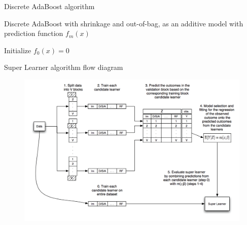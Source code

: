 
\begin{frame}[fragile]{Discrete AdaBoost algorithm}

Discrete AdaBoost with shrinkage and out-of-bag, as an additive model with prediction function $f_m(x)$

{%
\setlength{\interspacetitleruled}{0pt}%
\setlength{\algotitleheightrule}{0pt}%
\begin{algorithm}[H]
Initialize $f_0(x)=0$\;
\end{algorithm}}

\end{frame}


\begin{frame}{Super Learner algorithm flow diagram}

\begin{figure}
	\includegraphics[width=\textwidth]{./Figures/sup-learn.jpg}
\end{figure}

\end{frame}

